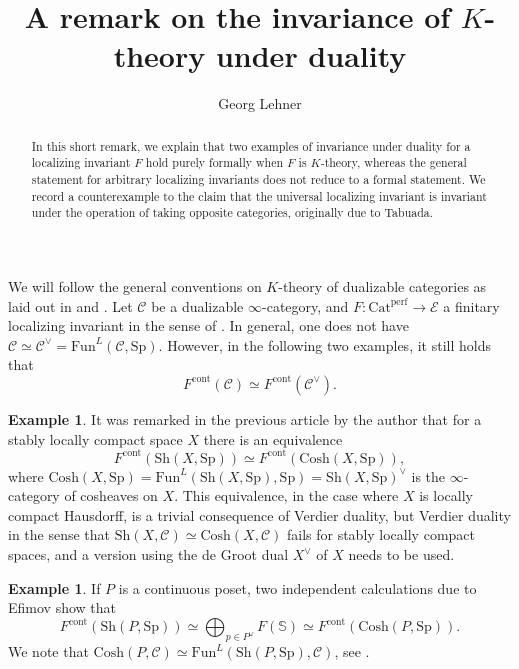 \documentclass[10pt]{amsart}
\theoremstyle{definition}
\newtheorem{example}[theorem]{Example}
\newcommand{\Fun}{\text{Fun}}
\newcommand{\Sh}{\mathrm{Sh}}
\newcommand{\Cosh}{\mathrm{Cosh}}
\newcommand{\Sp}{\mathrm{Sp}}
\newcommand{\Cat}{\mathrm{Cat}}
\newcommand{\perf}{\mathrm{perf}}
\newcommand{\cont}{\mathrm{cont}}
\begin{document}
\title{A remark on the invariance of $K$-theory under duality}
\author{Georg Lehner}
\begin{abstract}
In this short remark, we explain that two examples of invariance under duality for a localizing invariant $F$ hold purely formally when $F$ is $K$-theory, whereas the general statement for arbitrary localizing invariants does not reduce to a formal statement. We record a counterexample to the claim that the universal localizing invariant is invariant under the operation of taking opposite categories, originally due to Tabuada.
\end{abstract}
\maketitle

We will follow the general conventions on $K$-theory of dualizable categories as laid out in \cite{efimov2025ktheorylocalizinginvariantslarge} and \cite{krause_nikolaus_puetzstueck}. Let $\mathcal{C}$ be a dualizable $\infty$-category, and $F : \Cat^\perf \rightarrow \mathcal{E}$ a finitary localizing invariant in the sense of \cite{blumberg_gepner_tabuada}. In general, one does not have $\mathcal{C} \simeq \mathcal{C}^\vee = \mathrm{Fun}^L( \mathcal{C}, \Sp )$. However, in the following two examples, it still holds that \[F^{\cont}( \mathcal{C}) \simeq F^{\cont}( \mathcal{C}^\vee).\]

\begin{example} \label{example1}
It was remarked in the previous article \cite{lehner2026algebraicktheorystablycompact} by the author that for a stably locally compact space $X$ there is an equivalence
\[ F^{\cont}( \Sh( X, \Sp ) ) \simeq F^{\cont}( \Cosh( X, \Sp ) ),\]
where $ \Cosh( X, \Sp ) = \Fun^L( \Sh( X, \Sp ) , \Sp ) = \Sh( X, \Sp )^\vee$ is the $\infty$-category of cosheaves on $X$. This equivalence, in the case where $X$ is locally compact Hausdorff, is a trivial consequence of Verdier duality, but Verdier duality in the sense that $\Sh( X, \mathcal{C} ) \simeq \Cosh( X, \mathcal{C} )$ fails for stably locally compact spaces, and a version using the de Groot dual $X^\vee$ of $X$ needs to be used.
\end{example}

\begin{example} \label{example2}
If $P$ is a continuous poset, two independent calculations due to Efimov \cite[Section 5]{efimov2025ktheorylocalizinginvariantslarge} show that
\[ F^{\cont}( \Sh( P, \Sp ) ) \simeq \bigoplus_{p \in P^\omega} F(  \mathbb{S} ) \simeq F^{\cont}( \Cosh( P, \Sp) ).\]
We note that $\Cosh( P, \mathcal{C} ) \simeq \Fun^L( \Sh( P, \Sp), \mathcal{C} )$, see \cite[Section 21.1]{lurieSAG}.
\end{example}
\end{document}
